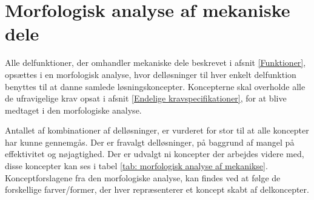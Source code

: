 \section{Morfologisk analyse af mekaniske dele} \label{Morfologisk analyse - mekaniske dele}
Alle delfunktioner, der omhandler mekaniske dele beskrevet i afsnit \ref{Funktioner}, opsættes i en morfologisk analyse, hvor delløsninger til hver enkelt delfunktion benyttes til at danne samlede løsningskoncepter. Koncepterne skal overholde alle de ufravigelige krav opsat i afsnit \ref{Endelige kravspecifikationer}, for at blive medtaget i den morfologiske analyse.

Antallet af kombinationer af delløsninger, er vurderet for stor til at alle koncepter har kunne gennemgås. Der er fravalgt delløsninger, på baggrund af mangel på effektivitet og nøjagtighed. Der er udvalgt ni koncepter der arbejdes videre med, disse koncepter kan ses i tabel \ref{tab: morfologisk analyse af mekanikse}. Konceptforslagene fra den morfologiske analyse, kan findes ved at følge de forskellige farver/former, der hver repræsenterer et koncept skabt af delkoncepter.




